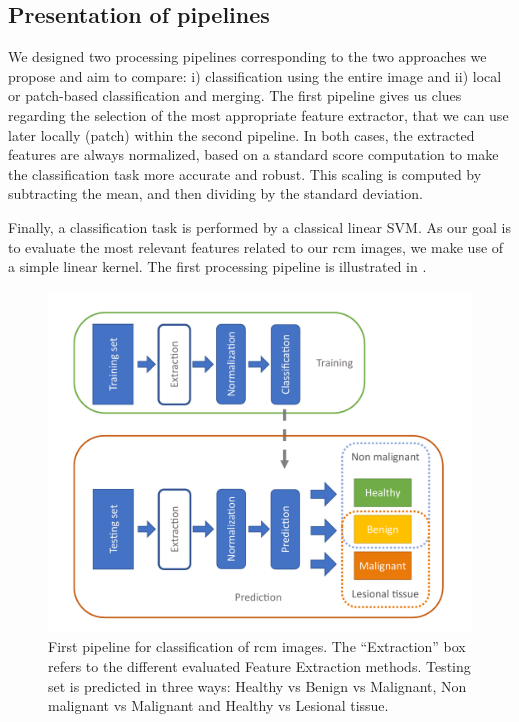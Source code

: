 \subsection{Presentation of pipelines}
\label{pipelines}
We designed two processing pipelines corresponding to the two approaches we propose and aim to compare: i) classification using the entire image and ii) local or patch-based classification and merging. The first pipeline gives us clues regarding the selection of the most appropriate feature extractor, that we can use later locally (patch) within the second pipeline. In both cases, the extracted features are always normalized, based on a standard score computation to make the classification task more accurate and robust. This scaling is computed by subtracting the mean, and then dividing by the standard deviation.\par
Finally, a classification task is performed by a classical linear SVM. As our goal is to evaluate the most relevant features related to our \ac{rcm} images, we make use of a simple linear kernel. The first processing pipeline is illustrated in .\par
\begin{figure}[H]
    \begin{center}
        \includegraphics[width=\linewidth]{content/figures/Simple.pdf}
        \caption{First pipeline for classification of \ac{rcm} images. The “Extraction” box refers to the different evaluated Feature Extraction methods. Testing set is predicted in three ways: Healthy vs Benign vs Malignant, Non malignant vs Malignant and Healthy vs Lesional tissue.}
        \label{simple}
    \end{center} 
\end{figure}
